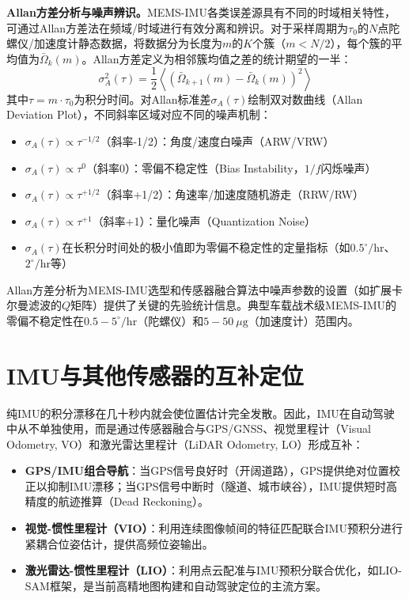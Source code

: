 \documentclass[12pt,a4paper,openany,UTF8]{ctexbook}
\begin{document}
\textbf{Allan方差分析与噪声辨识。}MEMS-IMU各类误差源具有不同的时域相关特性，可通过Allan方差法在频域/时域进行有效分离和辨识。对于采样周期为$\tau_0$的$N$点陀螺仪/加速度计静态数据，将数据分为长度为$m$的$K$个簇（$m < N/2$），每个簇的平均值为$\bar{\Omega}_k(m)$。Allan方差定义为相邻簇均值之差的统计期望的一半：
\begin{equation}\label{eq:allan_var}
\sigma^2_A(\tau) = \frac{1}{2}\left\langle \left(\bar{\Omega}_{k+1}(m) - \bar{\Omega}_k(m)\right)^2 \right\rangle
\end{equation}
其中$\tau = m \cdot \tau_0$为积分时间。对Allan标准差$\sigma_A(\tau)$绘制双对数曲线（Allan Deviation Plot），不同斜率区域对应不同的噪声机制：
\begin{itemize}
    \item $\sigma_A(\tau) \propto \tau^{-1/2}$（斜率-1/2）：角度/速度白噪声（ARW/VRW）
    \item $\sigma_A(\tau) \propto \tau^{0}$（斜率0）：零偏不稳定性（Bias Instability，$1/f$闪烁噪声）
    \item $\sigma_A(\tau) \propto \tau^{+1/2}$（斜率+1/2）：角速率/加速度随机游走（RRW/RW）
    \item $\sigma_A(\tau) \propto \tau^{+1}$（斜率+1）：量化噪声（Quantization Noise）
    \item $\sigma_A(\tau)$在长积分时间处的极小值即为零偏不稳定性的定量指标（如$0.5^\circ/\text{hr}$、$2^\circ/\text{hr}$等）
\end{itemize}
Allan方差分析为MEMS-IMU选型和传感器融合算法中噪声参数的设置（如扩展卡尔曼滤波的$Q$矩阵）提供了关键的先验统计信息。典型车载战术级MEMS-IMU的零偏不稳定性在$0.5-5^\circ/\text{hr}$（陀螺仪）和$5-50\ \mu\text{g}$（加速度计）范围内。

\section{IMU与其他传感器的互补定位}

纯IMU的积分漂移在几十秒内就会使位置估计完全发散。因此，IMU在自动驾驶中从不单独使用，而是通过传感器融合与GPS/GNSS、视觉里程计（Visual Odometry, VO）和激光雷达里程计（LiDAR Odometry, LO）形成互补：
\begin{itemize}
    \item \textbf{GPS/IMU组合导航}：当GPS信号良好时（开阔道路），GPS提供绝对位置校正以抑制IMU漂移；当GPS信号中断时（隧道、城市峡谷），IMU提供短时高精度的航迹推算（Dead Reckoning）。
    \item \textbf{视觉-惯性里程计（VIO）}：利用连续图像帧间的特征匹配联合IMU预积分进行紧耦合位姿估计，提供高频位姿输出。
    \item \textbf{激光雷达-惯性里程计（LIO）}：利用点云配准与IMU预积分联合优化，如LIO-SAM框架，是当前高精地图构建和自动驾驶定位的主流方案。
\end{itemize}
\end{document}
